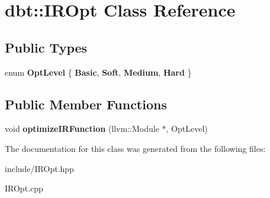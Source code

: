 \hypertarget{classdbt_1_1_i_r_opt}{}\section{dbt\+:\+:I\+R\+Opt Class Reference}
\label{classdbt_1_1_i_r_opt}
\subsection*{Public Types}
\begin{DoxyCompactItemize}
\item 
enum {\bfseries Opt\+Level} \{ {\bfseries Basic}, 
{\bfseries Soft}, 
{\bfseries Medium}, 
{\bfseries Hard}
 \}\hypertarget{classdbt_1_1_i_r_opt_a269a9377acf828ee812af3c98295e235}{}\label{classdbt_1_1_i_r_opt_a269a9377acf828ee812af3c98295e235}

\end{DoxyCompactItemize}
\subsection*{Public Member Functions}
\begin{DoxyCompactItemize}
\item 
void {\bfseries optimize\+I\+R\+Function} (llvm\+::\+Module $\ast$, Opt\+Level)\hypertarget{classdbt_1_1_i_r_opt_a143ef63180958877aacc34698cb30cb6}{}\label{classdbt_1_1_i_r_opt_a143ef63180958877aacc34698cb30cb6}

\end{DoxyCompactItemize}


The documentation for this class was generated from the following files\+:\begin{DoxyCompactItemize}
\item 
include/I\+R\+Opt.\+hpp\item 
I\+R\+Opt.\+cpp\end{DoxyCompactItemize}
